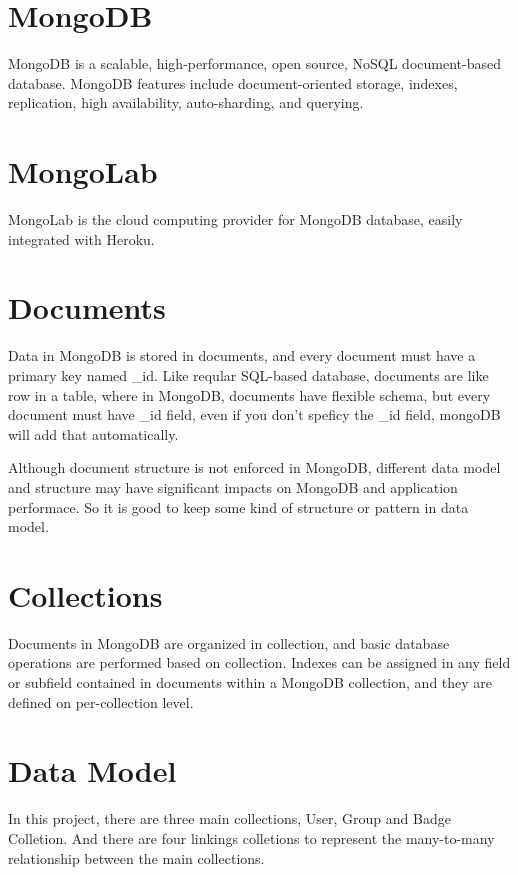 
\section{MongoDB}
 MongoDB is a scalable, high-performance, open source, NoSQL document-based database. MongoDB features include document-oriented storage, indexes, replication, high availability, auto-sharding, and querying.  \cite{mongodb}

\section{MongoLab}
MongoLab is the cloud computing provider for MongoDB database, easily integrated with Heroku. \cite{mongolab}

\section{Documents}
Data in MongoDB is stored in documents, and every document must have a primary key named {\_id}. Like reqular SQL-based database, documents are like row in a table, where in MongoDB, documents have flexible schema, but every document must have {\_id} field, even if you don't speficy the {\_id} field, mongoDB will add that automatically.  \cite{mongodb}

Although document structure is not enforced in MongoDB, different data model and structure may have significant impacts on MongoDB and application performace. So it is good to keep some kind of structure or pattern in data model.  

\section{Collections}
Documents in MongoDB are organized in collection, and basic database operations are performed based on collection. Indexes can be assigned in any field or subfield contained in documents within a MongoDB collection, and they are defined on per-collection level.  \cite{mongodb}   

\section{Data Model}
In this project, there are three main collections, User, Group and Badge Colletion. And there are four linkings colletions to represent the many-to-many relationship between the main collections.

